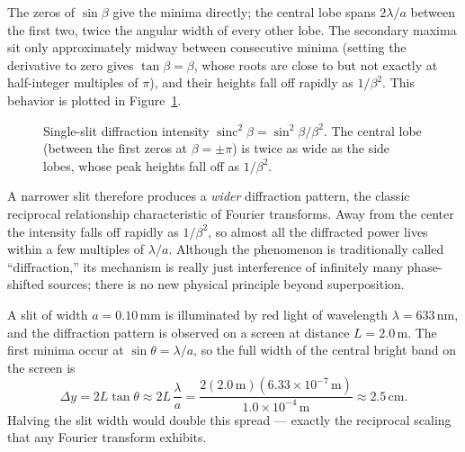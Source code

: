 The zeros of $\sin\beta$ give the minima directly; the central lobe spans $2\lambda/a$ between the first two, twice the angular width of every other lobe. The secondary maxima sit only approximately midway between consecutive minima (setting the derivative to zero gives $\tan\beta=\beta$, whose roots are close to but not exactly at half-integer multiples of $\pi$), and their heights fall off rapidly as $1/\beta^2$. This behavior is plotted in Figure~\ref{fig:sinc}.

\begin{figure}[ht]
    \centering
    \caption{Single-slit diffraction intensity $\operatorname{sinc}^2\beta = \sin^2\beta/\beta^2$. The central lobe (between the first zeros at $\beta = \pm\pi$) is twice as wide as the side lobes, whose peak heights fall off as $1/\beta^2$.}
    \label{fig:sinc}
\end{figure} A narrower slit therefore produces a \emph{wider} diffraction pattern, the classic reciprocal relationship characteristic of Fourier transforms. Away from the center the intensity falls off rapidly as $1/\beta^2$, so almost all the diffracted power lives within a few multiples of $\lambda/a$. Although the phenomenon is traditionally called ``diffraction,'' its mechanism is really just interference of infinitely many phase-shifted sources; there is no new physical principle beyond superposition.

\begin{example}
A slit of width $a = 0.10\,\text{mm}$ is illuminated by red light of wavelength $\lambda = 633\,\text{nm}$, and the diffraction pattern is observed on a screen at distance $L = 2.0\,\text{m}$. The first minima occur at $\sin\theta = \lambda/a$, so the full width of the central bright band on the screen is
\begin{equation}
    \Delta y = 2 L \tan\theta \approx 2 L\, \frac{\lambda}{a} = \frac{2 (2.0\,\text{m})(6.33\times 10^{-7}\,\text{m})}{1.0\times 10^{-4}\,\text{m}} \approx 2.5\,\text{cm}.
\end{equation}
Halving the slit width would double this spread --- exactly the reciprocal scaling that any Fourier transform exhibits.
\end{example}

